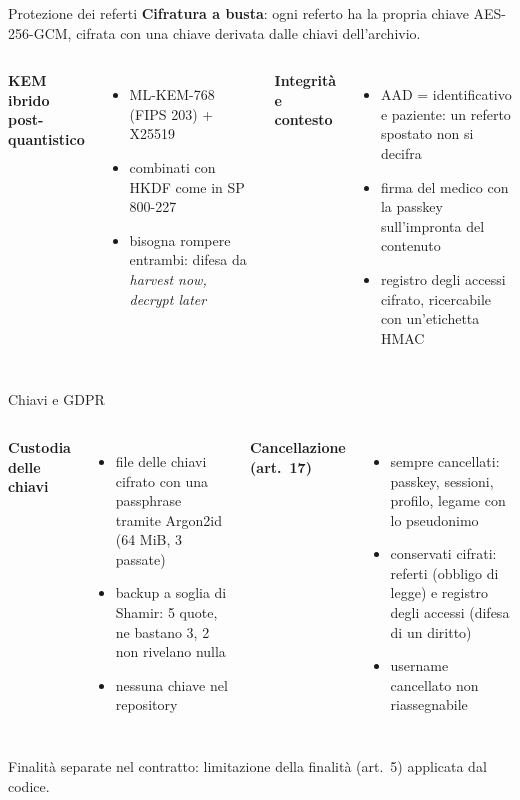 \documentclass[11pt,aspectratio=169]{beamer}
\begin{document}
\begin{frame}{Protezione dei referti}
\textbf{Cifratura a busta}: ogni referto ha la propria chiave AES-256-GCM, cifrata con una chiave derivata dalle chiavi dell'archivio.

\medskip
\begin{columns}[T]
\textbf{KEM ibrido post-quantistico}
\begin{itemize}
  \item \alert{ML-KEM-768} (FIPS 203) + \alert{X25519}
  \item combinati con HKDF come in SP 800-227
  \item bisogna rompere entrambi: difesa da \emph{harvest now, decrypt later}
\end{itemize}
\textbf{Integrità e contesto}
\begin{itemize}
  \item AAD = identificativo e paziente: un referto spostato non si decifra
  \item firma del medico con la passkey sull'impronta del contenuto
  \item registro degli accessi cifrato, ricercabile con un'etichetta HMAC
\end{itemize}
\end{columns}
\end{frame}

\begin{frame}{Chiavi e GDPR}
\begin{columns}[T]
\textbf{Custodia delle chiavi}
\begin{itemize}
  \item file delle chiavi cifrato con una passphrase tramite \alert{Argon2id} (64 MiB, 3 passate)
  \item backup a soglia di \alert{Shamir}: 5 quote, ne bastano 3, 2 non rivelano nulla
  \item nessuna chiave nel repository
\end{itemize}
\textbf{Cancellazione (art.~17)}
\begin{itemize}
  \item sempre cancellati: passkey, sessioni, profilo, legame con lo pseudonimo
  \item conservati cifrati: referti (obbligo di legge) e registro degli accessi (difesa di un diritto)
  \item username cancellato non riassegnabile
\end{itemize}
\end{columns}

\medskip
\small Finalità separate nel contratto: limitazione della finalità (art.~5) applicata dal codice.
\end{frame}
\end{document}
